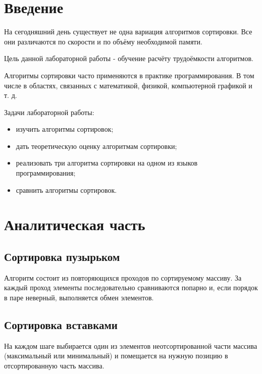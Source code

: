 \documentclass[12pt]{report}
\begin{document}



\tableofcontents

\newpage
\chapter*{Введение}

На сегодняшний день существует не одна вариация алгоритмов сортировки. Все они различаются по скорости и по объёму необходимой памяти.

Цель данной лабораторной работы - обучение расчёту трудоёмкости алгоритмов.

Алгоритмы сортировки часто применяются в практике программирования. В том числе в областях, связанных с математикой, физикой, компьютерной графикой и т. д.

Задачи лабораторной работы:
\begin{itemize}
	\item изучить алгоритмы сортировок;
	\item дать теоретическую оценку алгоритмам сортировки;
	\item реализовать три алгоритма сортировки на одном из языков программирования;  
	\item сравнить алгоритмы сортировок.
\end{itemize}

\chapter{Аналитическая часть}
\section{Сортировка пузырьком}
Алгоритм состоит из повторяющихся проходов по сортируемому массиву. За каждый проход элементы последовательно сравниваются попарно и, если порядок в паре неверный, выполняется обмен элементов.

\section{Сортировка вставками}
На каждом шаге выбирается один из элементов неотсортированной части массива (максимальный или минимальный) и помещается на нужную позицию в отсортированную часть массива. 
\end{document}
